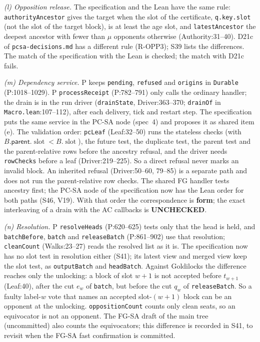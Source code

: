 \documentclass{article}
\newcommand{\slot}{\operatorname{slot}}
\newcommand{\nm}[1]{\nolinkurl{#1}}
\newcommand{\Fm}{\textbf{form}}
\newcommand{\UC}{\textbf{UNCHECKED}}
\begin{document}
\emph{(l) Opposition release.}  The specification and the Lean have the
same rule: \nm{authorityAncestor} gives the target when the slot of the
certificate, \nm{q.key.slot} (not the slot of the target block), is at
least the age slot, and \nm{latestAncestor} the deepest ancestor with
fewer than $\mu$ opponents otherwise (Authority:31--40).  D21c of
\nm{pcsa-decisions.md} has a different rule (R-OPP3); S39 lists the
differences.  The match of the specification with the Lean is checked;
the match with D21c fails.

\emph{(m) Dependency service.}  P keeps \nm{pending}, \nm{refused} and
\nm{origins} in \nm{Durable} (P:1018--1029).  P \nm{processReceipt}
(P:782--791) only calls the ordinary handler; the drain is in the run
driver (\nm{drainState}, Driver:363--370; \nm{drainOf} in
\nm{Macro.lean}:107--112), after each delivery, tick and restart step.  The
specification puts the same service in the PC-SA node (spec~4) and
proposes it as shared item (e).  The validation order: \nm{pcLeaf}
(Leaf:32--50) runs the stateless checks (with $B.\mathsf{parent}.\slot<B.\slot$),
the future test, the duplicate test, the parent test and the
parent-relative rows before the ancestry refusal, and the driver needs
\nm{rowChecks} before a leaf (Driver:219--225).  So a direct refusal never
marks an invalid block.  An inherited refusal (Driver:50--60, 79--85) is a
separate path and does not run the parent-relative row checks.  The
shared FG handler tests ancestry first; the PC-SA node of the
specification now has the Lean order for both paths (S46, V19).  With
that order the correspondence is \Fm; the exact interleaving of a drain
with the AC callbacks is \UC.

\emph{(n) Resolution.}  P \nm{resolveHeads} (P:620--625) tests only that
the head is held, and \nm{batchBefore}, \nm{batch} and \nm{releaseBatch}
(P:861--902) use that resolution; \nm{cleanCount} (Walks:23--27) reads the
resolved list as it is.  The specification now has no slot test in
resolution either (S41); its latest view and merged view keep the slot
test, as \nm{outputBatch} and \nm{headBatch}.  Against Goldilocks the
difference reaches only the unlocking: a block of slot $w+1$ is not
accepted before $t_{w+1}$ (Leaf:40), after the cut $e_w$ of \nm{batch},
but before the cut $q_w$ of \nm{releaseBatch}.  So a faulty label-$w$ vote
that names an accepted slot-$(w+1)$ block can be an opponent at the
unlocking.  \nm{oppositionCount} counts only clean seats, so an
equivocator is not an opponent.  The FG-SA draft of the main tree
(uncommitted) also counts the equivocators; this difference is recorded
in S41, to revisit when the FG-SA fast confirmation is committed.
\end{document}
